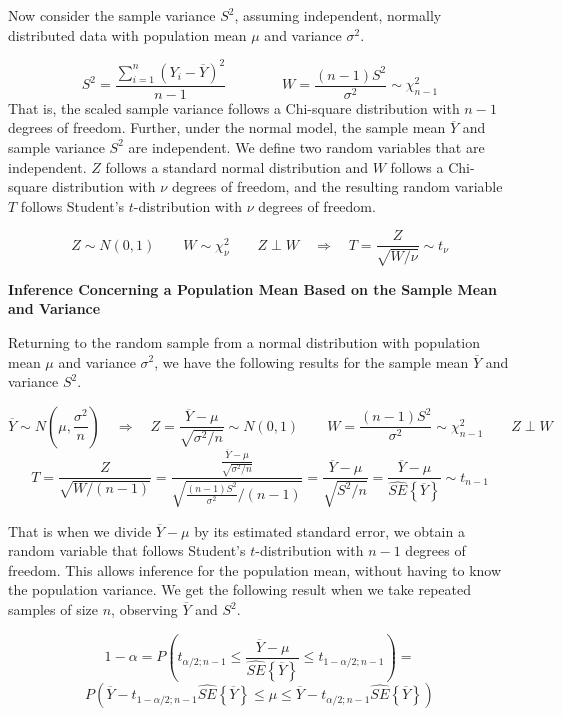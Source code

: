 \documentclass[
]{book}
\begin{document}
Now consider the sample variance \(S^2\), assuming independent, normally
distributed data with population mean \(\mu\) and variance \(\sigma^2\).

\[
S^2 = \frac{\sum_{i=1}^n\left(Y_i-\overline{Y}\right)^2}{n-1}  \qquad \qquad
W=\frac{(n-1)S^2}{\sigma^2}\sim \chi_{n-1}^2
\] That is, the scaled sample variance follows a Chi-square distribution
with \(n-1\) degrees of freedom. Further, under the normal model, the
sample mean \(\overline{Y}\) and sample variance \(S^2\) are
independent. We define two random variables that are independent. \(Z\)
follows a standard normal distribution and \(W\) follows a Chi-square
distribution with \(\nu\) degrees of freedom, and the resulting random
variable \(T\) follows Student's \(t\)-distribution with \(\nu\) degrees
of freedom.

\[
Z \sim N(0,1) \qquad W\sim \chi_{\nu}^2 \qquad Z\perp W \quad \Rightarrow \quad
T=\frac{Z}{\sqrt{W/\nu}}\sim t_{\nu}
\]

\textbf{Inference Concerning a Population Mean Based on the Sample Mean
and Variance}

Returning to the random sample from a normal distribution with
population mean \(\mu\) and variance \(\sigma^2\), we have the following
results for the sample mean \(\overline{Y}\) and variance \(S^2\).

\[
\overline{Y} \sim N\left(\mu,\frac{\sigma^2}{n}\right) \quad \Rightarrow \quad
Z=\frac{\overline{Y}-\mu}{\sqrt{\sigma^2/n}} \sim N(0,1)  \qquad
W=\frac{(n-1)S^2}{\sigma^2} \sim \chi_{n-1}^2 \qquad Z\perp W
\] \[
T=\frac{Z}{\sqrt{W/(n-1)}} = 
\frac{\frac{\overline{Y}-\mu}{\sqrt{\sigma^2/n}}}{\sqrt{\frac{(n-1)S^2}{\sigma^2}/(n-1)}}
= \frac{\overline{Y}-\mu}{\sqrt{S^2/n}}=
\frac{\overline{Y}-\mu}{\hat{SE}\left\{\overline{Y}\right\}} \sim t_{n-1}
\]

That is when we divide \(\overline{Y}-\mu\) by its estimated standard
error, we obtain a random variable that follows Student's
\(t\)-distribution with \(n-1\) degrees of freedom. This allows
inference for the population mean, without having to know the population
variance. We get the following result when we take repeated samples of
size \(n\), observing \(\overline{Y}\) and \(S^2\).

\[
1-\alpha=P\left(t_{\alpha/2;n-1} \leq 
\frac{\overline{Y}-\mu}{\hat{SE}\left\{\overline{Y}\right\}} \leq
t_{1-\alpha/2;n-1}
\right)=
\] \[
P\left(\overline{Y}-t_{1-\alpha/2;n-1}\hat{SE}\left\{\overline{Y}\right\}\leq
\mu\leq \overline{Y}-t_{\alpha/2;n-1}\hat{SE}\left\{\overline{Y}\right\}\right)
\]
\end{document}
